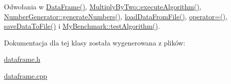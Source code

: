 Odwołania w \hyperlink{dataframe_8cpp_source_l00012}{Data\-Frame()}, \hyperlink{multiplybytwo_8cpp_source_l00011}{Multiply\-By\-Two\-::execute\-Algorithm()}, \hyperlink{numbergenerator_8h_source_l00031}{Number\-Generator\-::generate\-Numbers()}, \hyperlink{dataframe_8cpp_source_l00020}{load\-Data\-From\-File()}, \hyperlink{dataframe_8cpp_source_l00044}{operator=()}, \hyperlink{dataframe_8cpp_source_l00032}{save\-Data\-To\-File()} i \hyperlink{mybenchmark_8cpp_source_l00012}{My\-Benchmark\-::test\-Algorithm()}.



Dokumentacja dla tej klasy została wygenerowana z plików\-:\begin{DoxyCompactItemize}
\item 
\hyperlink{dataframe_8h}{dataframe.\-h}\item 
\hyperlink{dataframe_8cpp}{dataframe.\-cpp}\end{DoxyCompactItemize}
